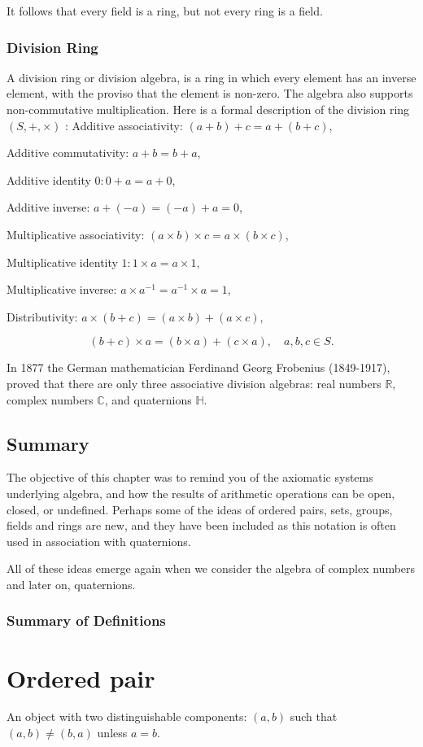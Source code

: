 \documentclass[10pt]{article}
\begin{document}
It follows that every field is a ring, but not every ring is a field.

\subsubsection{Division Ring}
A division ring or division algebra, is a ring in which every element has an inverse element, with the proviso that the element is non-zero. The algebra also supports non-commutative multiplication. Here is a formal description of the division ring $(S,+, \times)$ : Additive associativity: $(a+b)+c=a+(b+c)$,

Additive commutativity: $a+b=b+a$,

Additive identity $0: 0+a=a+0$,

Additive inverse: $a+(-a)=(-a)+a=0$,

Multiplicative associativity: $(a \times b) \times c=a \times(b \times c)$,

Multiplicative identity $1: 1 \times a=a \times 1$,

Multiplicative inverse: $a \times a^{-1}=a^{-1} \times a=1$,

Distributivity: $a \times(b+c)=(a \times b)+(a \times c)$,

$$
(b+c) \times a=(b \times a)+(c \times a), \quad a, b, c \in S .
$$

In 1877 the German mathematician Ferdinand Georg Frobenius (1849-1917), proved that there are only three associative division algebras: real numbers $\mathbb{R}$, complex numbers $\mathbb{C}$, and quaternions $\mathbb{H}$.

\subsection{Summary}
The objective of this chapter was to remind you of the axiomatic systems underlying algebra, and how the results of arithmetic operations can be open, closed, or undefined. Perhaps some of the ideas of ordered pairs, sets, groups, fields and rings are new, and they have been included as this notation is often used in association with quaternions.

All of these ideas emerge again when we consider the algebra of complex numbers and later on, quaternions.

\subsubsection{Summary of Definitions}
\section{Ordered pair}
An object with two distinguishable components: $(a, b)$ such that $(a, b) \neq(b, a)$ unless $a=b$.
\end{document}
